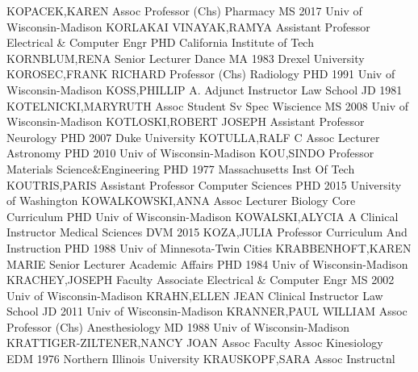 \documentclass[
]{article}
\begin{document}
\textbar KOPACEK,KAREN \textbar Assoc Professor (Chs) \textbar{}
 \textbar Pharmacy \textbar MS 2017 Univ of
Wisconsin-Madison \textbar KORLAKAI VINAYAK,RAMYA \textbar Assistant
Professor \textbar{}  \textbar Electrical \& Computer Engr
\textbar PHD California Institute of Tech \textbar KORNBLUM,RENA
\textbar Senior Lecturer \textbar{}  \textbar Dance
\textbar MA 1983 Drexel University \textbar KOROSEC,FRANK RICHARD
\textbar Professor (Chs) \textbar{}  \textbar Radiology
\textbar PHD 1991 Univ of Wisconsin-Madison \textbar KOSS,PHILLIP A.
\textbar Adjunct Instructor \textbar{}  \textbar Law School
\textbar JD 1981 \textbar KOTELNICKI,MARYRUTH \textbar Assoc Student Sv
Spec \textbar{}  \textbar Wiscience \textbar MS 2008 Univ of
Wisconsin-Madison \textbar KOTLOSKI,ROBERT JOSEPH \textbar Assistant
Professor \textbar{}  \textbar Neurology \textbar PHD 2007
Duke University \textbar KOTULLA,RALF C \textbar Assoc Lecturer
\textbar{}  \textbar Astronomy \textbar PHD 2010 Univ of
Wisconsin-Madison \textbar KOU,SINDO \textbar Professor \textbar{}
 \textbar Materials Science\&Engineering \textbar PHD 1977
Massachusetts Inst Of Tech \textbar KOUTRIS,PARIS \textbar Assistant
Professor \textbar{}  \textbar Computer Sciences
\textbar PHD 2015 University of Washington \textbar KOWALKOWSKI,ANNA
\textbar Assoc Lecturer \textbar{}  \textbar Biology Core
Curriculum \textbar PHD Univ of Wisconsin-Madison
\textbar KOWALSKI,ALYCIA A \textbar Clinical Instructor \textbar{}
 \textbar Medical Sciences \textbar DVM 2015
\textbar KOZA,JULIA \textbar Professor \textbar{} 
\textbar Curriculum And Instruction \textbar PHD 1988 Univ of
Minnesota-Twin Cities \textbar KRABBENHOFT,KAREN MARIE \textbar Senior
Lecturer \textbar{}  \textbar Academic Affairs \textbar PHD
1984 Univ of Wisconsin-Madison \textbar KRACHEY,JOSEPH \textbar Faculty
Associate \textbar{}  \textbar Electrical \& Computer Engr
\textbar MS 2002 Univ of Wisconsin-Madison \textbar KRAHN,ELLEN JEAN
\textbar Clinical Instructor \textbar{}  \textbar Law School
\textbar JD 2011 Univ of Wisconsin-Madison \textbar KRANNER,PAUL WILLIAM
\textbar Assoc Professor (Chs) \textbar{} 
\textbar Anesthesiology \textbar MD 1988 Univ of Wisconsin-Madison
\textbar KRATTIGER-ZILTENER,NANCY JOAN \textbar Assoc Faculty Assoc
\textbar{}  \textbar Kinesiology \textbar EDM 1976 Northern
Illinois University \textbar KRAUSKOPF,SARA \textbar Assoc Instructnl
\end{document}
